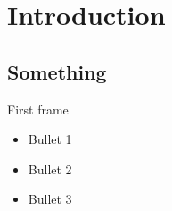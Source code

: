\section{Introduction}
\subsection{Something}

\begin{frame}{First frame}
\begin{itemize}[<+->]
\item Bullet 1
\item Bullet 2
\item Bullet 3
\end{itemize}
\end{frame}
